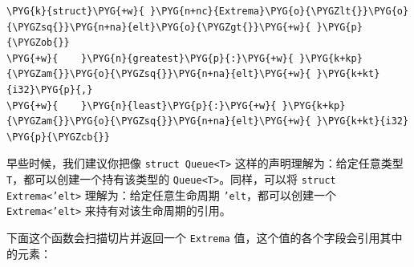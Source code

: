 \begin{Verbatim}[commandchars=\\\{\},breaklines=true,breakanywhere=true,fontsize=\codefont,xleftmargin=17bp]
\PYG{k}{struct}\PYG{+w}{ }\PYG{n+nc}{Extrema}\PYG{o}{\PYGZlt{}}\PYG{o}{\PYGZsq{}}\PYG{n+na}{elt}\PYG{o}{\PYGZgt{}}\PYG{+w}{ }\PYG{p}{\PYGZob{}}
\PYG{+w}{    }\PYG{n}{greatest}\PYG{p}{:}\PYG{+w}{ }\PYG{k+kp}{\PYGZam{}}\PYG{o}{\PYGZsq{}}\PYG{n+na}{elt}\PYG{+w}{ }\PYG{k+kt}{i32}\PYG{p}{,}
\PYG{+w}{    }\PYG{n}{least}\PYG{p}{:}\PYG{+w}{ }\PYG{k+kp}{\PYGZam{}}\PYG{o}{\PYGZsq{}}\PYG{n+na}{elt}\PYG{+w}{ }\PYG{k+kt}{i32}
\PYG{p}{\PYGZcb{}}
\end{Verbatim}

早些时候，我们建议你把像 \texttt{struct Queue<T>} 这样的声明理解为：给定任意类型 \texttt{T}，都可以创建一个持有该类型的 \texttt{Queue<T>}。同样，可以将 \texttt{struct Extrema<'elt>} 理解为：给定任意生命周期 \texttt{'elt}，都可以创建一个 \texttt{Extrema<'elt>} 来持有对该生命周期的引用。

下面这个函数会扫描切片并返回一个 \texttt{Extrema} 值，这个值的各个字段会引用其中的元素：

